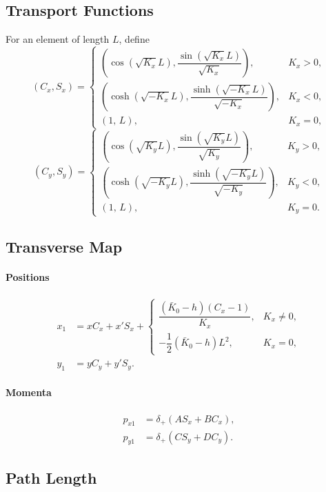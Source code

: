 \subsection*{Transport Functions}

For an element of length $L$, define
\[
(C_x,S_x)=
\begin{cases}
\left(\cos(\sqrt{K_x}L), \dfrac{\sin(\sqrt{K_x}L)}{\sqrt{K_x}}\right),
& K_x>0, \\[1em]
\left(\cosh(\sqrt{-K_x}L), \dfrac{\sinh(\sqrt{-K_x}L)}{\sqrt{-K_x}}\right),
& K_x<0, \\[1em]
(1,\,L), & K_x=0,
\end{cases}
\]
\[
(C_y,S_y)=
\begin{cases}
\left(\cos(\sqrt{K_y}L), \dfrac{\sin(\sqrt{K_y}L)}{\sqrt{K_y}}\right),
& K_y>0, \\[1em]
\left(\cosh(\sqrt{-K_y}L), \dfrac{\sinh(\sqrt{-K_y}L)}{\sqrt{-K_y}}\right),
& K_y<0, \\[1em]
(1,\,L), & K_y=0.
\end{cases}
\]

\subsection*{Transverse Map}

\paragraph{Positions}
\begin{align}
x_1 &= x C_x + x' S_x
+ \begin{cases}
\dfrac{(\bar{K}_0-h)(C_x-1)}{K_x}, & K_x\neq 0, \\[1em]
-\dfrac{1}{2}(\bar{K}_0-h)L^2, & K_x=0,
\end{cases}
\\
y_1 &= y C_y + y' S_y .
\end{align}

\paragraph{Momenta}
\begin{align}
p_{x1} &= \delta_+ \left(A S_x + B C_x\right), \\
p_{y1} &= \delta_+ \left(C S_y + D C_y\right).
\end{align}

\subsection*{Path Length}

